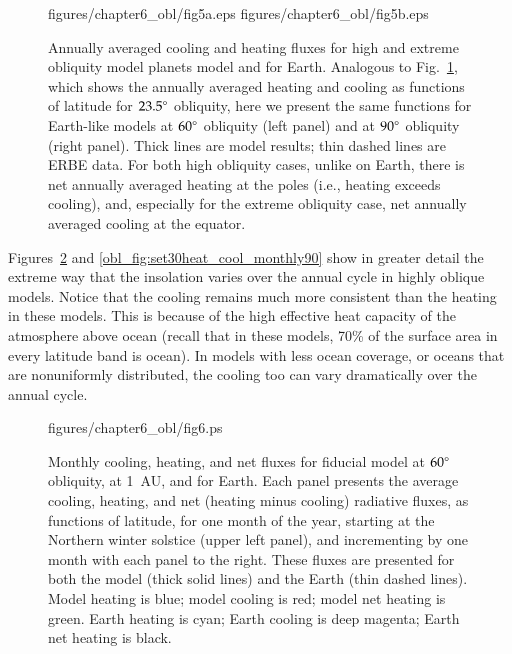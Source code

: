 \begin{figure}[p]
\plottwo
{figures/chapter6_obl/fig5a.eps}
{figures/chapter6_obl/fig5b.eps}
\caption[Annually averaged cooling and heating fluxes for high and
extreme obliquity model planets model and for Earth.]{Annually
averaged cooling and heating fluxes for high and extreme obliquity
model planets model and for Earth.  Analogous to
Fig.~\ref{obl_fig:set30heat_cool_6090}, which shows the annually
averaged heating and cooling as functions of latitude for $23.5\mbox{$^\circ$}$
obliquity, here we present the same functions for Earth-like models at
$60\degr$ obliquity (left panel) and at $90\mbox{$^\circ$}$ obliquity (right
panel). Thick lines are model results; thin dashed lines are ERBE
data.  For both high obliquity cases, unlike on Earth, there is net
annually averaged heating at the poles (i.e., heating exceeds
cooling), and, especially for the extreme obliquity case, net annually
averaged cooling at the equator.}
\label{obl_fig:set30heat_cool_6090}
\end{figure}


\afterpage{\clearpage}

Figures~\ref{obl_fig:set30heat_cool_monthly60} and
\ref{obl_fig:set30heat_cool_monthly90} show in greater detail the
extreme way that the insolation varies over the annual cycle in highly
oblique models.  Notice that the cooling remains much more consistent
than the heating in these models.  This is because of the high
effective heat capacity of the atmosphere above ocean (recall that in
these models, 70\% of the surface area in every latitude band is
ocean).  In models with less ocean coverage, or oceans that are
nonuniformly distributed, the cooling too can vary dramatically over
the annual cycle.


\begin{figure}[p]
\plotone
{figures/chapter6_obl/fig6.ps}
\caption[Monthly cooling, heating, and net fluxes for fiducial model
at $60\degr$ obliquity, at 1~AU, and for Earth.]{Monthly cooling,
heating, and net fluxes for fiducial model at $60\degr$ obliquity, at
1~AU, and for Earth.  Each panel presents the average cooling,
heating, and net (heating minus cooling) radiative fluxes, as
functions of latitude, for one month of the year, starting at the
Northern winter solstice (upper left panel), and incrementing by one
month with each panel to the right.  These fluxes are presented for
both the model (thick solid lines) and the Earth (thin dashed lines).
Model heating is blue; model cooling is red; model net heating is
green.  Earth heating is cyan; Earth cooling is deep magenta; Earth
net heating is black.}
\label{obl_fig:set30heat_cool_monthly60}
\end{figure}

